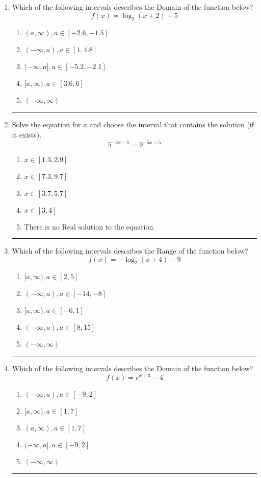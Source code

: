 \documentclass[14pt]{extbook}
\newcommand{\litem}[1]{\item#1\hspace*{-1cm}\rule{\textwidth}{0.4pt}}
\begin{document}
\begin{enumerate}
{\begin{enumerate}[label=\Alph*.]
\end{enumerate} }
\litem{
Which of the following intervals describes the Domain of the function below?\[ f(x) = \log_2{(x+2)}+5 \]\begin{enumerate}[label=\Alph*.]
\item \( (a, \infty), a \in [-2.6, -1.5] \)
\item \( (-\infty, a), a \in [1, 4.8] \)
\item \( (-\infty, a], a \in [-5.2, -2.1] \)
\item \( [a, \infty), a \in [3.6, 6] \)
\item \( (-\infty, \infty) \)

\end{enumerate} }
\litem{
Solve the equation for $x$ and choose the interval that contains the solution (if it exists).\[ 5^{-3x-5} = 9^{-5x+5} \]\begin{enumerate}[label=\Alph*.]
\item \( x \in [1.3, 2.9] \)
\item \( x \in [7.3, 9.7] \)
\item \( x \in [3.7, 5.7] \)
\item \( x \in [3, 4] \)
\item \( \text{There is no Real solution to the equation.} \)

\end{enumerate} }
\litem{
Which of the following intervals describes the Range of the function below?\[ f(x) = -\log_2{(x+4)}-9 \]\begin{enumerate}[label=\Alph*.]
\item \( [a, \infty), a \in [2, 5] \)
\item \( (-\infty, a), a \in [-14, -8] \)
\item \( [a, \infty), a \in [-6, 1] \)
\item \( (-\infty, a), a \in [8, 15] \)
\item \( (-\infty, \infty) \)

\end{enumerate} }
\litem{
Which of the following intervals describes the Domain of the function below?\[ f(x) = e^{x+3}-4 \]\begin{enumerate}[label=\Alph*.]
\item \( (-\infty, a), a \in [-9, 2] \)
\item \( [a, \infty), a \in [1, 7] \)
\item \( (a, \infty), a \in [1, 7] \)
\item \( (-\infty, a], a \in [-9, 2] \)
\item \( (-\infty, \infty) \)


\end{enumerate}}
\end{enumerate}
\end{document}
